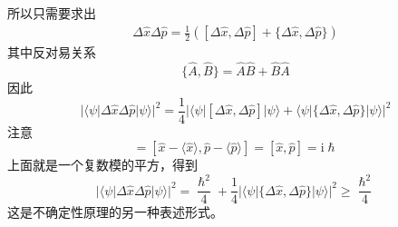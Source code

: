         所以只需要求出
        \begin{equation}\begin{aligned}
            \Delta \hat{x} \Delta \hat{p} = \frac 12([\Delta \hat{x}, \Delta \hat{p}] + \{\Delta \hat{x}, \Delta \hat{p}\})
        \end{aligned}\end{equation}
        其中反对易关系
        \begin{equation}
            \{\hat{A}, \hat{B}\} = \hat{A}\hat{B} + \hat{B}\hat{A}
        \end{equation}
        因此
        \begin{equation}
            |\langle \psi |\Delta \hat{x} \Delta \hat{p}|\psi \rangle|^2 = \frac 14 |\langle \psi |[\Delta \hat{x},\Delta \hat{p}]|\psi \rangle + \langle \psi |\{\Delta \hat{x},\Delta \hat{p}\}|\psi \rangle|^2
        \end{equation}
        注意
        \begin{equation}
            [\Delta \hat{x},\Delta \hat{p}] = [\hat{x}-\langle \hat{x} \rangle, \hat{p}-\langle \hat{p} \rangle ] = [\hat{x},\hat{p}] = \mathrm{i}\hslash
        \end{equation}
        上面就是一个复数模的平方，得到
        \begin{equation}
            |\langle \psi |\Delta \hat{x} \Delta \hat{p}|\psi \rangle|^2 = \frac {\hslash^2}4 + \frac 14 |\langle \psi |\{\Delta \hat{x},\Delta \hat{p}\}|\psi \rangle|^2 \geqslant \frac {\hslash^2}4
        \end{equation}
        这是不确定性原理的另一种表述形式。

